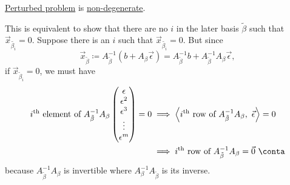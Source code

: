 \begin{answer}
	\begin{claim}
		\hyperref[def:perturbed-problem]{Perturbed problem} is \hyperref[conj:non-degeneracy-hypothesis]{non-degenerate}.
	\end{claim}
	\begin{explanation}
		This is equivalent to show that there are no \(i\) in the later basis \(\tilde{\beta}\) such that \(\vec{x}_{\tilde{\beta_i}} = 0\). Suppose there is an \(i\) such that
		\(\vec{x}_{\tilde{\beta_i}} = 0\). But since
		\[
			\vec{x}_{\tilde{\beta}} \coloneqq A^{-1}_{\tilde{\beta}}(b + A_{\beta}\vec{\epsilon}) = A^{-1}_{\tilde{\beta}}b + A^{-1}_{\tilde{\beta}}A_{\beta}\vec{\epsilon},
		\]
		if \(\vec{x} _{\widetilde{\beta}_i} = 0\), we must have
		\[
			\begin{split}
				i^{\text{th}} \text{ element of }A^{-1}_{\tilde{\beta}}A_{\beta}\begin{pmatrix}
					                                                                \epsilon   \\
					                                                                \epsilon^2 \\
					                                                                \epsilon^3 \\
					                                                                \vdots     \\
					                                                                \epsilon^m \\
				                                                                \end{pmatrix} = 0
				 & \implies \left< i^{\text{th}} \text{ row of } A^{-1}_{\tilde{\beta}}A_{\beta},\ \vec{\epsilon} \right> = 0 \\
				 & \implies i^{\text{th}} \text{ row of } A^{-1}_{\tilde{\beta}}A_{\beta} = \vec{0}\ \conta
			\end{split}
		\]
		because \(A^{-1}_{\tilde{\beta}}A_{\beta}\) is invertible where \(A^{-1}_{\beta}A_{\tilde{\beta}}\) is its inverse.
	\end{explanation}
\end{answer}